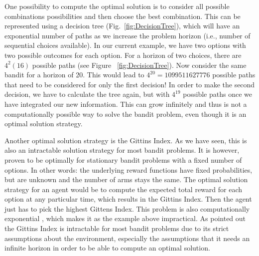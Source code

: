 One possibility to compute the optimal solution is to consider all possible combinations possibilities and then choose the best combination. This can be represented using a decision tree (Fig.~\ref{fig:DecisionTree}), which will have an exponential number of paths as we increase the problem horizon (i.e., number of sequential choices available). %
In our current example, we have two options with two possible outcomes for each option. For a horizon of two choices, there are $4^2 (16)$ possible paths (see Figure ~\ref{fig:DecisionTree}). 
Now consider the same bandit for a horizon of 20. This would lead to $4^{20}=1099511627776$ possible paths that need to be considered for only the first decision! In order to make the second decision, we have to calculate the tree again, but with $4^{19}$ possible paths once we have integrated our new information. 
This can grow infinitely and thus is not a computationally possible way to solve the bandit problem, even though it is an optimal solution strategy. %

Another optimal solution strategy is the Gittins Index. As we have seen, this is also an intractable solution strategy for most bandit problems. It is however, proven to be optimally for stationary bandit problems with a fixed number of options. In other words: the underlying reward functions have fixed probabilities, but are unknown and the number of arms stays the same. The optimal solution strategy for an agent would be to compute the expected total reward for each option at any particular time, which results in the Gittins Index. Then the agent just has to pick the highest Gittens Index. 
This problem is also computationally exponential \citep{gittins1979bandit}, which makes it as the example above impractical. 
As \cite{cohen2007should} pointed out the Gittins Index is intractable for most bandit problems due to its strict assumptions about the environment, especially the assumptions that it needs an infinite horizon in order to be able to compute an optimal solution.  

